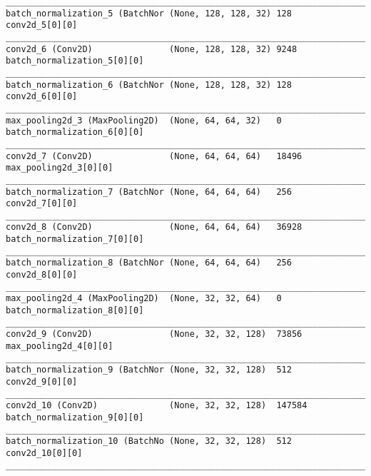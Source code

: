 \begin{verbatim}
__________________________________________________________________________________________________
batch_normalization_5 (BatchNor (None, 128, 128, 32) 128         conv2d_5[0][0]                   
__________________________________________________________________________________________________
conv2d_6 (Conv2D)               (None, 128, 128, 32) 9248        batch_normalization_5[0][0]      
__________________________________________________________________________________________________
batch_normalization_6 (BatchNor (None, 128, 128, 32) 128         conv2d_6[0][0]                   
__________________________________________________________________________________________________
max_pooling2d_3 (MaxPooling2D)  (None, 64, 64, 32)   0           batch_normalization_6[0][0]      
__________________________________________________________________________________________________
conv2d_7 (Conv2D)               (None, 64, 64, 64)   18496       max_pooling2d_3[0][0]            
__________________________________________________________________________________________________
batch_normalization_7 (BatchNor (None, 64, 64, 64)   256         conv2d_7[0][0]                   
__________________________________________________________________________________________________
conv2d_8 (Conv2D)               (None, 64, 64, 64)   36928       batch_normalization_7[0][0]      
__________________________________________________________________________________________________
batch_normalization_8 (BatchNor (None, 64, 64, 64)   256         conv2d_8[0][0]                   
__________________________________________________________________________________________________
max_pooling2d_4 (MaxPooling2D)  (None, 32, 32, 64)   0           batch_normalization_8[0][0]      
__________________________________________________________________________________________________
conv2d_9 (Conv2D)               (None, 32, 32, 128)  73856       max_pooling2d_4[0][0]            
__________________________________________________________________________________________________
batch_normalization_9 (BatchNor (None, 32, 32, 128)  512         conv2d_9[0][0]                   
__________________________________________________________________________________________________
conv2d_10 (Conv2D)              (None, 32, 32, 128)  147584      batch_normalization_9[0][0]      
__________________________________________________________________________________________________
batch_normalization_10 (BatchNo (None, 32, 32, 128)  512         conv2d_10[0][0]                  
__________________________________________________________________________________________________

\end{verbatim}
